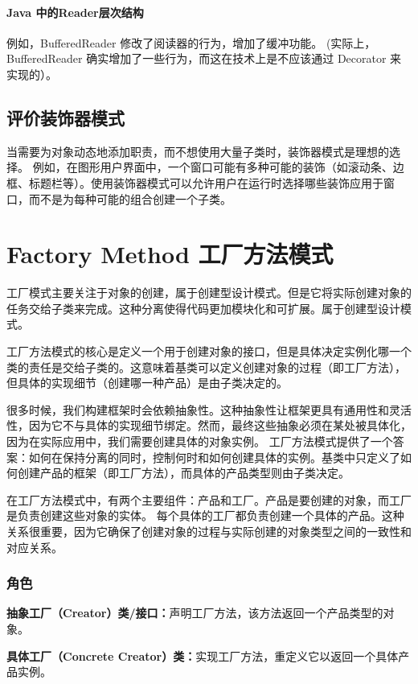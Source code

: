 \paragraph{Java 中的Reader层次结构}
例如，BufferedReader 修改了阅读器的行为，增加了缓冲功能。
(实际上，BufferedReader 确实增加了一些行为，而这在技术上是不应该通过 Decorator 来实现的）。

\subsection{评价装饰器模式}

当需要为对象动态地添加职责，而不想使用大量子类时，装饰器模式是理想的选择。
例如，在图形用户界面中，一个窗口可能有多种可能的装饰（如滚动条、边框、标题栏等）。使用装饰器模式可以允许用户在运行时选择哪些装饰应用于窗口，而不是为每种可能的组合创建一个子类。


\section{Factory Method 工厂方法模式}

工厂模式主要关注于对象的创建，属于创建型设计模式。但是它将实际创建对象的任务交给子类来完成。这种分离使得代码更加模块化和可扩展。属于创建型设计模式。

工厂方法模式的核心是定义一个用于创建对象的接口，但是具体决定实例化哪一个类的责任是交给子类的。这意味着基类可以定义创建对象的过程（即工厂方法），但具体的实现细节（创建哪一种产品）是由子类决定的。

很多时候，我们构建框架时会依赖抽象性。这种抽象性让框架更具有通用性和灵活性，因为它不与具体的实现细节绑定。然而，最终这些抽象必须在某处被具体化，因为在实际应用中，我们需要创建具体的对象实例。
工厂方法模式提供了一个答案：如何在保持分离的同时，控制何时和如何创建具体的实例。基类中只定义了如何创建产品的框架（即工厂方法），而具体的产品类型则由子类决定。

在工厂方法模式中，有两个主要组件：产品和工厂。产品是要创建的对象，而工厂是负责创建这些对象的实体。
每个具体的工厂都负责创建一个具体的产品。这种关系很重要，因为它确保了创建对象的过程与实际创建的对象类型之间的一致性和对应关系。

\subsubsection{角色}
\textbf{抽象工厂（Creator）类/接口：}声明工厂方法，该方法返回一个产品类型的对象。

\textbf{具体工厂（Concrete Creator）类：}实现工厂方法，重定义它以返回一个具体产品实例。

